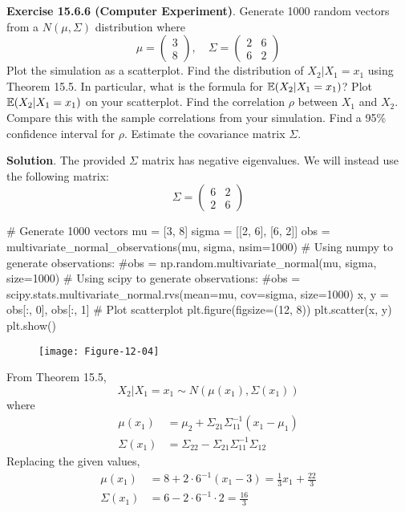 \textbf{Exercise 15.6.6 (Computer Experiment)}. Generate 1000 random
vectors from a \(N(\mu, \Sigma)\) distribution where
\[
\mu = \begin{pmatrix} 3 \\ 8\end{pmatrix}
, \quad
\Sigma = \begin{pmatrix}
2 & 6 \\
6 & 2
\end{pmatrix}
\]
Plot the simulation as a scatterplot. Find the distribution of
\(X_{2} | X_{1} = x_{1}\) using Theorem 15.5. In particular, what is the
formula for \(\operatorname{\mathbb{E}}(X_{2} | X_{1} = x_{1})\)? Plot
\(\operatorname{\mathbb{E}}(X_{2} | X_{1} = x_{1})\) on your scatterplot. Find the
correlation \(\rho\) between \(X_{1}\) and \(X_{2}\). Compare this with the
sample correlations from your simulation. Find a 95\% confidence
interval for \(\rho\). Estimate the covariance matrix \(\Sigma\).

\textbf{Solution}.
The provided \(\Sigma\) matrix has negative eigenvalues. We will instead
use the following matrix:
\[
\Sigma = \begin{pmatrix} 6 & 2 \\ 2 & 6\end{pmatrix}
\]

\begin{python}
# Generate 1000 vectors
mu = [3, 8]
sigma = [[2, 6], [6, 2]]
obs = multivariate_normal_observations(mu, sigma, nsim=1000)
# Using numpy to generate observations:
#obs = np.random.multivariate_normal(mu, sigma, size=1000)
# Using scipy to generate observations:
#obs = scipy.stats.multivariate_normal.rvs(mean=mu, cov=sigma, size=1000)
x, y = obs[:, 0], obs[:, 1]
# Plot scatterplot
plt.figure(figsize=(12, 8))
plt.scatter(x, y)
plt.show()
\end{python}

\begin{figure}[H]
\centering
\texttt{[image: Figure-12-04]}
\end{figure}

From Theorem 15.5,
\[
X_{2} | X_{1} = x_{1} \sim N(\mu(x_{1}), \Sigma(x_{1}))
\]
where
\begin{align*}
\mu(x_{1}) &= \mu_{2} + \Sigma_{21} \Sigma_{11}^{-1} (x_{1} - \mu_{1}) \\
\Sigma(x_{1}) &= \Sigma_{22} - \Sigma_{21}\Sigma_{11}^{-1}\Sigma_{12}
\end{align*}
Replacing the given values,
\begin{align*}
\mu(x_{1}) &= 8 + 2 \cdot 6^{-1} (x_{1} - 3) = \frac{1}{3} x_{1} + \frac{22}{3}\\
\Sigma(x_{1}) &= 6 - 2 \cdot 6^{-1} \cdot 2 = \frac{16}{3}
\end{align*}

